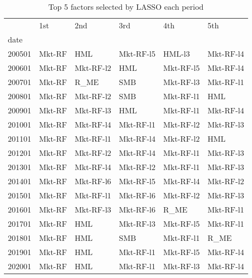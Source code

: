 \begin{table}
\caption{Top 5 factors selected by LASSO each period}
\label{tab:top5factor}
\begin{tabular}{llllll}
\toprule
 & 1st & 2nd & 3rd & 4th & 5th \\
date &  &  &  &  &  \\
\midrule
200501 & Mkt-RF & HML & Mkt-RF-l5 & HML-l3 & Mkt-RF-l4 \\
200601 & Mkt-RF & Mkt-RF-l2 & HML & Mkt-RF-l5 & Mkt-RF-l4 \\
200701 & Mkt-RF & R_ME & SMB & Mkt-RF-l3 & Mkt-RF-l1 \\
200801 & Mkt-RF & Mkt-RF-l2 & SMB & Mkt-RF-l1 & HML \\
200901 & Mkt-RF & Mkt-RF-l3 & HML & Mkt-RF-l1 & Mkt-RF-l4 \\
201001 & Mkt-RF & Mkt-RF-l4 & Mkt-RF-l1 & Mkt-RF-l2 & Mkt-RF-l3 \\
201101 & Mkt-RF & Mkt-RF-l1 & Mkt-RF-l4 & Mkt-RF-l2 & HML \\
201201 & Mkt-RF & Mkt-RF-l2 & Mkt-RF-l4 & Mkt-RF-l1 & Mkt-RF-l3 \\
201301 & Mkt-RF & Mkt-RF-l4 & Mkt-RF-l2 & Mkt-RF-l1 & Mkt-RF-l3 \\
201401 & Mkt-RF & Mkt-RF-l6 & Mkt-RF-l5 & Mkt-RF-l4 & Mkt-RF-l2 \\
201501 & Mkt-RF & Mkt-RF-l1 & Mkt-RF-l6 & Mkt-RF-l2 & Mkt-RF-l3 \\
201601 & Mkt-RF & Mkt-RF-l3 & Mkt-RF-l6 & R_ME & Mkt-RF-l1 \\
201701 & Mkt-RF & HML & Mkt-RF-l3 & Mkt-RF-l5 & Mkt-RF-l1 \\
201801 & Mkt-RF & HML & SMB & Mkt-RF-l1 & R_ME \\
201901 & Mkt-RF & HML & Mkt-RF-l1 & Mkt-RF-l5 & Mkt-RF-l4 \\
202001 & Mkt-RF & HML & Mkt-RF-l1 & Mkt-RF-l3 & Mkt-RF-l4 \\
\bottomrule
\end{tabular}
\end{table}
